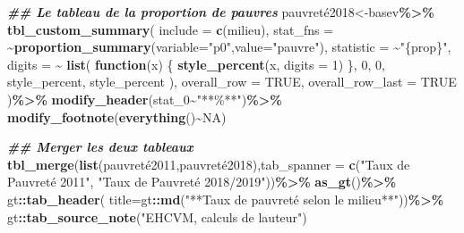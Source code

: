 \documentclass[
]{article}
\newenvironment{Shaded}{\begin{snugshade}}{\end{snugshade}}
\newcommand{\AttributeTok}[1]{\textcolor[rgb]{0.13,0.29,0.53}{#1}}
\newcommand{\ConstantTok}[1]{\textcolor[rgb]{0.56,0.35,0.01}{#1}}
\newcommand{\ControlFlowTok}[1]{\textcolor[rgb]{0.13,0.29,0.53}{\textbf{#1}}}
\newcommand{\DecValTok}[1]{\textcolor[rgb]{0.00,0.00,0.81}{#1}}
\newcommand{\DocumentationTok}[1]{\textcolor[rgb]{0.56,0.35,0.01}{\textbf{\textit{#1}}}}
\newcommand{\FunctionTok}[1]{\textcolor[rgb]{0.13,0.29,0.53}{\textbf{#1}}}
\newcommand{\NormalTok}[1]{#1}
\newcommand{\OtherTok}[1]{\textcolor[rgb]{0.56,0.35,0.01}{#1}}
\newcommand{\SpecialCharTok}[1]{\textcolor[rgb]{0.81,0.36,0.00}{\textbf{#1}}}
\newcommand{\StringTok}[1]{\textcolor[rgb]{0.31,0.60,0.02}{#1}}
\begin{document}
\begin{Shaded}
\begin{Highlighting}[]
\DocumentationTok{\#\# Le tableau de la proportion de pauvres}
\NormalTok{pauvreté2018}\OtherTok{\textless{}{-}}\NormalTok{basev}\SpecialCharTok{\%\textgreater{}\%}
  \FunctionTok{tbl\_custom\_summary}\NormalTok{(}
  \AttributeTok{include =} \FunctionTok{c}\NormalTok{(milieu),}
  \AttributeTok{stat\_fns =} \SpecialCharTok{\textasciitilde{}}\FunctionTok{proportion\_summary}\NormalTok{(}\AttributeTok{variable=}\StringTok{"p0"}\NormalTok{,}\AttributeTok{value=}\StringTok{"pauvre"}\NormalTok{),}
  \AttributeTok{statistic =} \SpecialCharTok{\textasciitilde{}}\StringTok{"\{prop\}"}\NormalTok{,}
  \AttributeTok{digits =} \SpecialCharTok{\textasciitilde{}} \FunctionTok{list}\NormalTok{(}
      \ControlFlowTok{function}\NormalTok{(x) \{}
        \FunctionTok{style\_percent}\NormalTok{(x, }\AttributeTok{digits =} \DecValTok{1}\NormalTok{)}
\NormalTok{      \},}
      \DecValTok{0}\NormalTok{, }\DecValTok{0}\NormalTok{, style\_percent, style\_percent}
\NormalTok{    ),}
  \AttributeTok{overall\_row =} \ConstantTok{TRUE}\NormalTok{,}
  \AttributeTok{overall\_row\_last =} \ConstantTok{TRUE}
\NormalTok{)}\SpecialCharTok{\%\textgreater{}\%}
  \FunctionTok{modify\_header}\NormalTok{(stat\_0}\SpecialCharTok{\textasciitilde{}}\StringTok{"**\%**"}\NormalTok{)}\SpecialCharTok{\%\textgreater{}\%}
  \FunctionTok{modify\_footnote}\NormalTok{(}\FunctionTok{everything}\NormalTok{()}\SpecialCharTok{\textasciitilde{}}\ConstantTok{NA}\NormalTok{)}

\DocumentationTok{\#\# Merger les deux tableaux}
\FunctionTok{tbl\_merge}\NormalTok{(}\FunctionTok{list}\NormalTok{(pauvreté2011,pauvreté2018),}\AttributeTok{tab\_spanner =} 
            \FunctionTok{c}\NormalTok{(}\StringTok{"Taux de Pauvreté 2011"}\NormalTok{,}
              \StringTok{"Taux de Pauvreté 2018/2019"}\NormalTok{))}\SpecialCharTok{\%\textgreater{}\%}
  \FunctionTok{as\_gt}\NormalTok{()}\SpecialCharTok{\%\textgreater{}\%}
\NormalTok{  gt}\SpecialCharTok{::}\FunctionTok{tab\_header}\NormalTok{(}
    \AttributeTok{title=}\NormalTok{gt}\SpecialCharTok{::}\FunctionTok{md}\NormalTok{(}\StringTok{"**Taux de pauvreté selon le milieu**"}\NormalTok{))}\SpecialCharTok{\%\textgreater{}\%}
\NormalTok{  gt}\SpecialCharTok{::}\FunctionTok{tab\_source\_note}\NormalTok{(}\StringTok{"EHCVM, calculs de l\textquotesingle{}auteur"}\NormalTok{)}
\end{Highlighting}
\end{Shaded}
\end{document}
